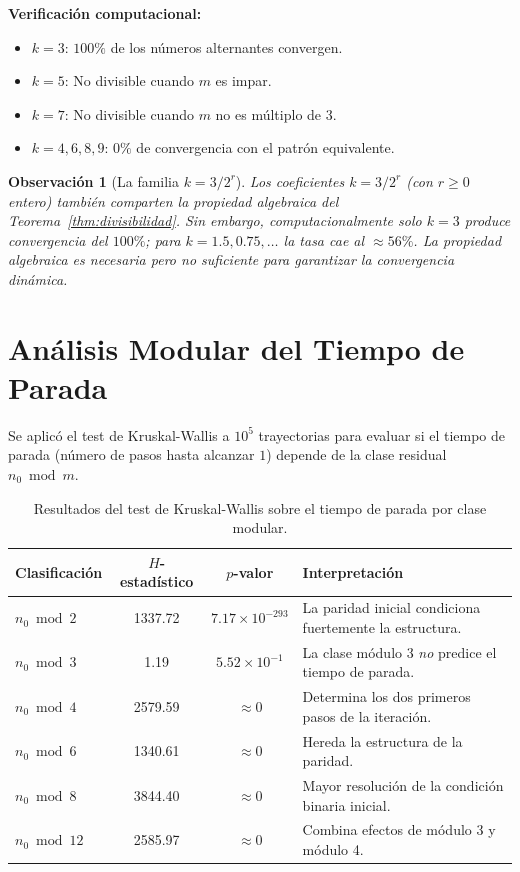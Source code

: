 \documentclass[11pt,a4paper]{article}
\newtheorem{remark}[theorem]{Observación}
\begin{document}
\textbf{Verificación computacional:}
\begin{itemize}[noitemsep]
  \item $k=3$: $100\%$ de los números alternantes convergen.
  \item $k=5$: No divisible cuando $m$ es impar.
  \item $k=7$: No divisible cuando $m$ no es múltiplo de $3$.
  \item $k=4,6,8,9$: $0\%$ de convergencia con el patrón equivalente.
\end{itemize}

\begin{remark}[La familia $k = 3/2^r$]
Los coeficientes $k = 3/2^r$ (con $r\ge 0$ entero) también comparten
la propiedad algebraica del Teorema~\ref{thm:divisibilidad}.
Sin embargo, computacionalmente solo $k=3$ produce convergencia
del $100\%$; para $k=1.5, 0.75, \dots$ la tasa cae al $\approx56\%$.
La propiedad algebraica es necesaria pero no suficiente para garantizar
la convergencia dinámica.
\end{remark}

\section{Análisis Modular del Tiempo de Parada}
\label{sec:modular}

Se aplicó el test de Kruskal-Wallis a $10^5$ trayectorias para evaluar
si el tiempo de parada (número de pasos hasta alcanzar $1$)
depende de la clase residual $n_0 \bmod m$.

\begin{table}[h!]
\centering
\caption{Resultados del test de Kruskal-Wallis sobre el tiempo de parada
         por clase modular.}
\label{tab:kruskal}
\small
\begin{tabularx}{\textwidth}{@{} l c c X @{}}
\toprule
Clasificación & $H$-estadístico & $p$-valor & Interpretación \\
\midrule
$n_0 \bmod 2$  & 1337.72 & $7.17\times10^{-293}$ &
  La paridad inicial condiciona fuertemente la estructura. \\
$n_0 \bmod 3$  & 1.19    & $5.52\times10^{-1}$   &
  La clase módulo 3 \emph{no} predice el tiempo de parada. \\
$n_0 \bmod 4$  & 2579.59 & $\approx 0$            &
  Determina los dos primeros pasos de la iteración. \\
$n_0 \bmod 6$  & 1340.61 & $\approx 0$            &
  Hereda la estructura de la paridad. \\
$n_0 \bmod 8$  & 3844.40 & $\approx 0$            &
  Mayor resolución de la condición binaria inicial. \\
$n_0 \bmod 12$ & 2585.97 & $\approx 0$            &
  Combina efectos de módulo 3 y módulo 4. \\
\bottomrule
\end{tabularx}
\end{table}
\end{document}
